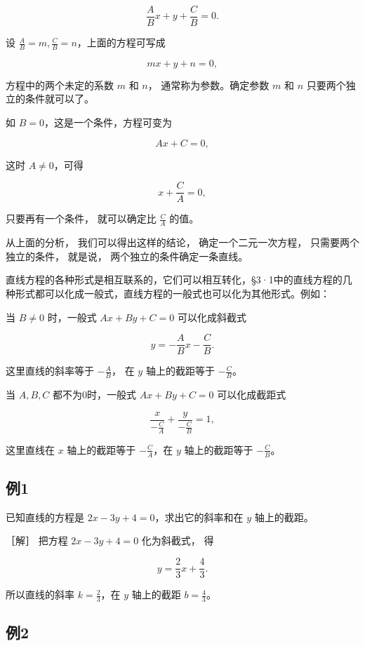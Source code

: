 \[
\frac {A}{B} x + y + \frac {C}{B} = 0.
\]

设 \(\frac{A}{B} = m, \frac{C}{B} = n\)，上面的方程可写成

\[
m x + y + n = 0,
\]

方程中的两个未定的系数 \(m\) 和 \(n\)， 通常称为参数。确定参数 \(m\) 和
\(n\) 只要两个独立的条件就可以了。

如 \(B = 0\)，这是一个条件，方程可变为

\[
A x + C = 0,
\]

这时 \(A \neq 0\)，可得

\[
x + \frac {C}{A} = 0,
\]

只要再有一个条件， 就可以确定比 \(\frac{C}{A}\) 的值。

从上面的分析， 我们可以得出这样的结论， 确定一个二元一次方程，
只需要两个独立的条件， 就是说， 两个独立的条件确定一条直线。

直线方程的各种形式是相互联系的，它们可以相互转化，§3·1中的直线方程的几种形式都可以化成一般式，直线方程的一般式也可以化为其他形式。例如：

当 \(B \neq 0\) 时，一般式 \(Ax + By + C = 0\) 可以化成斜截式

\[
y = - \frac {A}{B} x - \frac {C}{B}.
\]

这里直线的斜率等于 \(-\frac{A}{B}\)， 在 \(y\) 轴上的截距等于
\(-\frac{C}{B}\)。

当 \(A, B, C\) 都不为0时，一般式 \(Ax + By + C = 0\) 可以化成截距式

\[
\frac {x}{- \frac {C}{A}} + \frac {y}{- \frac {C}{B}} = 1,
\]

这里直线在 \(x\) 轴上的截距等于 \(-\frac{C}{A}\)，在 \(y\)
轴上的截距等于 \(-\frac{C}{B}\)。

\subsection{例1}\label{ux4f8b1-13}

已知直线的方程是 \(2x - 3y + 4 = 0\)，求出它的斜率和在 \(y\)
轴上的截距。

［解］ 把方程 \(2x - 3y + 4 = 0\) 化为斜截式， 得

\[
y = \frac {2}{3} x + \frac {4}{3}.
\]

所以直线的斜率 \(k = \frac{2}{3}\)，在 \(y\) 轴上的截距
\(b = \frac{4}{3}\)。

\subsection{例2}\label{ux4f8b2-12}

